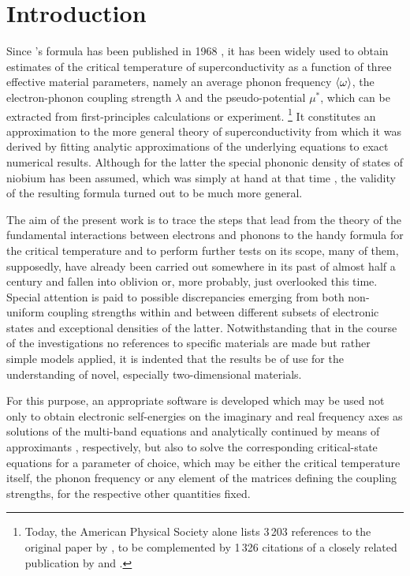 
\chapter{Introduction}

Since 's formula has been published in 1968 \cite{McMillan68}, it
has been widely used to obtain estimates of the critical temperature of
superconductivity as a function of three effective material parameters, namely an
average phonon frequency $\langle\omega\rangle$, the electron-phonon coupling strength
$\lambda$ and the  pseudo-potential $\mu^*$, which can be
extracted from first-principles calculations or experiment.%
%
\footnote{Today, the American Physical Society alone lists 3\,203 references to
the original paper by , to be complemented by 1\,326 citations of
a closely related publication by  and 
\cite{AllenDynes75}.}
%
It constitutes an approximation to the more general  theory of
superconductivity \cite{Eliashberg60} from which it was derived by fitting
analytic approximations of the underlying equations to exact numerical results.
Although for the latter the special phononic density of states of niobium has
been assumed, which was simply at hand at that time \cite{NakagawaWoods63}, the
validity of the resulting formula turned out to be much more general.

The aim of the present work is to trace the steps that lead from the theory of
the fundamental interactions between electrons and phonons to the handy formula
for the critical temperature and to perform further tests on its scope, many of
them, supposedly, have already been carried out somewhere in its past of almost
half a century and fallen into oblivion or, more probably, just overlooked this
time. Special attention is paid to possible discrepancies emerging from both
non-uniform coupling strengths within and between different subsets of
electronic states and exceptional densities of the latter. Notwithstanding that
in the course of the investigations no references to specific materials are made
but rather simple models applied, it is indented that the results be of use for
the understanding of novel, especially two-dimensional materials.

For this purpose, an appropriate software is developed which may be used not
only to obtain electronic self-energies on the imaginary and real frequency axes
as solutions of the multi-band  equations and analytically
continued by means of  approximants \cite{VidbergSerene77},
respectively, but also to solve the corresponding critical-state equations for a
parameter of choice, which may be either the critical temperature itself, the
phonon frequency or any element of the matrices defining the coupling strengths,
for the respective other quantities fixed.


